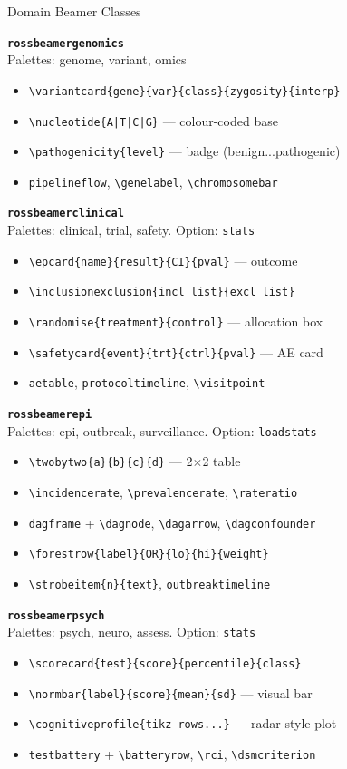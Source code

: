 \documentclass[palette=lancet]{rossbeamerscientific}
\newcommand{\cmd}[1]{\texttt{\color{rbAccent}\textbackslash #1}}
\newcommand{\env}[1]{\texttt{\color{rbSecondary}#1}}
\newcommand{\cls}[1]{\texttt{\color{rbPrimary}\bfseries #1}}
\newcommand{\opt}[1]{\texttt{\color{rbAccentDark}#1}}
\begin{document}
\begin{frame}{Domain Beamer Classes}
\begin{twocol}[0.47]
  \textbf{\cls{rossbeamergenomics}}\\
  Palettes: genome, variant, omics
  \begin{itemize}\setlength\itemsep{0pt}
    \item \cmd{variantcard\{gene\}\{var\}\{class\}\{zygosity\}\{interp\}}
    \item \cmd{nucleotide\{A|T|C|G\}} --- colour-coded base
    \item \cmd{pathogenicity\{level\}} --- badge (benign...pathogenic)
    \item \env{pipelineflow}, \cmd{genelabel}, \cmd{chromosomebar}
  \end{itemize}

\colbreak[0.47]
  \textbf{\cls{rossbeamerclinical}}\\
  Palettes: clinical, trial, safety.  Option: \opt{stats}
  \begin{itemize}\setlength\itemsep{0pt}
    \item \cmd{epcard\{name\}\{result\}\{CI\}\{pval\}} --- outcome
    \item \cmd{inclusionexclusion\{incl list\}\{excl list\}}
    \item \cmd{randomise\{treatment\}\{control\}} --- allocation box
    \item \cmd{safetycard\{event\}\{trt\}\{ctrl\}\{pval\}} --- AE card
    \item \env{aetable}, \env{protocoltimeline}, \cmd{visitpoint}
  \end{itemize}
  \vskip4pt

  \textbf{\cls{rossbeamerepi}}\\
  Palettes: epi, outbreak, surveillance.  Option: \opt{loadstats}
  \begin{itemize}\setlength\itemsep{0pt}
    \item \cmd{twobytwo\{a\}\{b\}\{c\}\{d\}} --- 2$\times$2 table
    \item \cmd{incidencerate}, \cmd{prevalencerate}, \cmd{rateratio}
    \item \env{dagframe} + \cmd{dagnode}, \cmd{dagarrow}, \cmd{dagconfounder}
    \item \cmd{forestrow\{label\}\{OR\}\{lo\}\{hi\}\{weight\}}
    \item \cmd{strobeitem\{n\}\{text\}}, \env{outbreaktimeline}
  \end{itemize}
  \vskip4pt

  \textbf{\cls{rossbeamerpsych}}\\
  Palettes: psych, neuro, assess.  Option: \opt{stats}
  \begin{itemize}\setlength\itemsep{0pt}
    \item \cmd{scorecard\{test\}\{score\}\{percentile\}\{class\}}
    \item \cmd{normbar\{label\}\{score\}\{mean\}\{sd\}} --- visual bar
    \item \cmd{cognitiveprofile\{tikz rows...\}} --- radar-style plot
    \item \env{testbattery} + \cmd{batteryrow}, \cmd{rci}, \cmd{dsmcriterion}
  \end{itemize}
  \vskip4pt


\end{twocol}
\end{frame}
\end{document}
